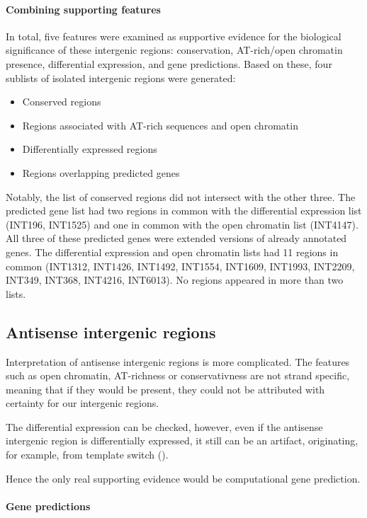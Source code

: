 \paragraph{Combining supporting features}

In total, five features were examined as supportive evidence for the biological significance of these intergenic regions:
conservation, AT-rich/open chromatin presence, differential expression, and gene predictions.
Based on these, four sublists of isolated intergenic regions were generated:

\begin{itemize}
  \item Conserved regions
  \item Regions associated with AT-rich sequences and open chromatin
  \item Differentially expressed regions
  \item Regions overlapping predicted genes
\end{itemize}

Notably, the list of conserved regions did not intersect with the other three.
The predicted gene list had two regions in common with the differential expression list (INT196, INT1525)
and one in common with the open chromatin list (INT4147).
All three of these predicted genes were extended versions of already annotated genes.
The differential expression and open chromatin lists had 11 regions in common
(INT1312, INT1426, INT1492, INT1554, INT1609, INT1993, INT2209, INT349, INT368, INT4216, INT6013).
No regions appeared in more than two lists.

\subsection{Antisense intergenic regions}

Interpretation of antisense intergenic regions is more complicated.
The features such as open chromatin, AT-richness or conservativness are not strand specific,
meaning that if they would be present, they could not be attributed with certainty for our intergenic regions.

The differential expression can be checked, however, even if the antisense intergenic region is differentially expressed,
it still can be an artifact, originating, for example, from template switch (\cite{Kebschull2015}).

Hence the only real supporting evidence would be computational gene prediction.

\paragraph{Gene predictions}

